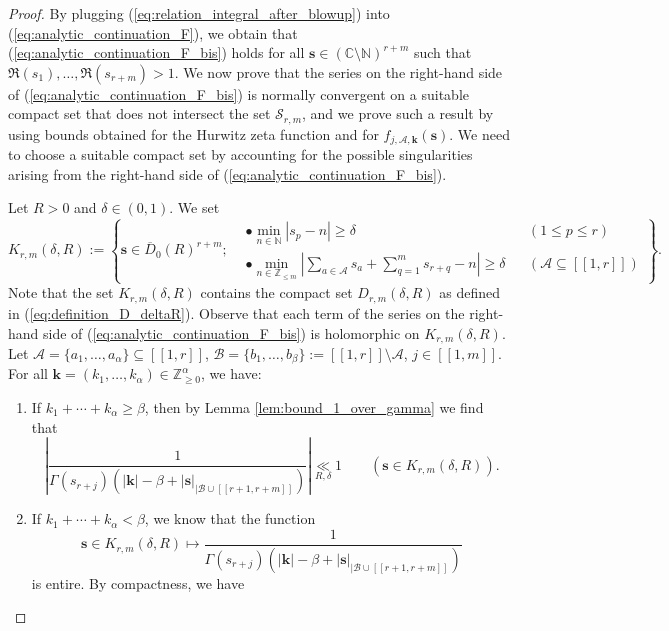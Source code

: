 \documentclass[a4paper]{amsart}
\theoremstyle{remark}
\theoremstyle{definition}
\begin{document}
\begin{proof}
By plugging (\ref{eq:relation_integral_after_blowup}) into (\ref{eq:analytic_continuation_F}), we obtain that (\ref{eq:analytic_continuation_F_bis}) holds for all $\mathbf{s}\in (\mathbb{C}\setminus \mathbb{N})^{r+m}$ such that $\Re(s_1),\ldots,\Re(s_{r+m})>1$. We now prove that the series on the right-hand side of (\ref{eq:analytic_continuation_F_bis}) is normally convergent on a suitable compact set that does not intersect the set $\mathcal{S}_{r,m}$, and we prove such a result by using bounds obtained for the Hurwitz zeta function and for $f_{j,\mathcal{A},\mathbf{k}}(\mathbf{s})$. We need to choose a suitable compact set by accounting for the possible singularities arising from the right-hand side of (\ref{eq:analytic_continuation_F_bis}).

Let $R>0$ and $\delta \in (0,1)$. We set
\[
    K_{r,m}(\delta,R) := \left\{ \mathbf{s} \in \overline{D}_0(R)^{r+m} ;
    \begin{aligned}
        &\bullet \min_{n \in \mathbb{N}}|s_{p}-n| \geq \delta && (1 \leq p \leq r) \\
        &\bullet \min_{n \in \mathbb{Z}_{\leq m}}\left|\sum_{a \in \mathcal{A}} s_{a} + \sum_{q=1}^m s_{r+q}-n\right| \geq \delta && (\mathcal{A} \subseteq [\![ 1,r ]\!])
    \end{aligned}
    \right\}.
\]
Note that the set $K_{r,m}(\delta,R)$ contains the compact set $D_{r,m}(\delta,R)$ as defined in (\ref{eq:definition_D_deltaR}). Observe that each term of the series on the right-hand side of (\ref{eq:analytic_continuation_F_bis}) is holomorphic on $K_{r,m}(\delta,R)$. Let $\mathcal{A}=
\{ a_1,\ldots,a_{\alpha} \} \subseteq [\![1,r]\!]$, $\mathcal{B}=\{ b_1,\ldots,b_{\beta} \} := [\![1,r]\!]\setminus \mathcal{A}$, $j \in [\![ 1,m ]\!]$. For all $\mathbf{k}=(k_1,\ldots,k_{\alpha}) \in \mathbb{Z}_{\geq 0}^{\alpha}$, we have:
\begin{enumerate}
\item[$\bullet$] If $k_1+\cdots+k_{\alpha} \geq \beta$, then by Lemma \ref{lem:bound_1_over_gamma} we find that
$$ \left|\frac{1}{\Gamma(s_{r+j})(|\mathbf{k}|-\beta+|\mathbf{s}|_{|\mathcal{B}\cup [\![ r+1,r+m ]\!]})}\right| \underset{R,\delta}{\ll} 1 \qquad (\mathbf{s} \in K_{r,m}(\delta,R)). $$
\item[$\bullet$] If $k_1+\cdots+k_{\alpha} < \beta$, we know that the function 
$$\mathbf{s} \in K_{r,m}(\delta,R) \mapsto \frac{1}{\Gamma(s_{r+j})(|\mathbf{k}|-\beta+|\mathbf{s}|_{|\mathcal{B}\cup [\![ r+1,r+m ]\!]})}$$
is entire. By compactness, we have

\end{enumerate}
\end{proof}
\end{document}
